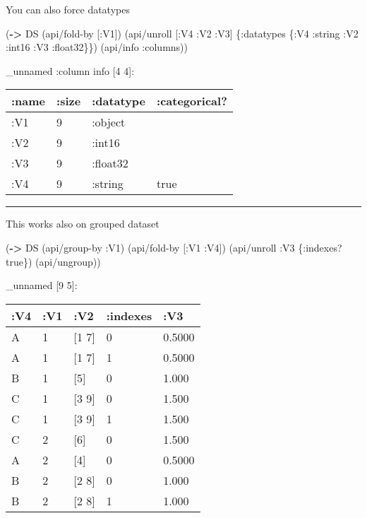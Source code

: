 \documentclass[]{article}
\newenvironment{Shaded}{\begin{snugshade}}{\end{snugshade}}
\newcommand{\KeywordTok}[1]{\textcolor[rgb]{0.13,0.29,0.53}{\textbf{#1}}}
\newcommand{\VariableTok}[1]{\textcolor[rgb]{0.00,0.00,0.00}{#1}}
\newcommand{\AttributeTok}[1]{\textcolor[rgb]{0.77,0.63,0.00}{#1}}
\newcommand{\NormalTok}[1]{#1}
\begin{document}
You can also force datatypes

\begin{Shaded}
\begin{Highlighting}[]
\NormalTok{(}\KeywordTok{->}\NormalTok{ DS}
\NormalTok{    (api/fold-by [}\AttributeTok{:V1}\NormalTok{])}
\NormalTok{    (api/unroll [}\AttributeTok{:V4} \AttributeTok{:V2} \AttributeTok{:V3}\NormalTok{] \{}\AttributeTok{:datatypes}\NormalTok{ \{}\AttributeTok{:V4} \AttributeTok{:string}
                                           \AttributeTok{:V2} \AttributeTok{:int16}
                                           \AttributeTok{:V3} \AttributeTok{:float32}\NormalTok{\}\})}
\NormalTok{    (api/info }\AttributeTok{:columns}\NormalTok{))}
\end{Highlighting}
\end{Shaded}

\_unnamed :column info {[}4 4{]}:

\begin{longtable}[]{@{}llll@{}}
\toprule
:name & :size & :datatype & :categorical?\tabularnewline
\midrule
\endhead
:V1 & 9 & :object &\tabularnewline
:V2 & 9 & :int16 &\tabularnewline
:V3 & 9 & :float32 &\tabularnewline
:V4 & 9 & :string & true\tabularnewline
\bottomrule
\end{longtable}

\begin{center}\rule{0.5\linewidth}{0.5pt}\end{center}

This works also on grouped dataset

\begin{Shaded}
\begin{Highlighting}[]
\NormalTok{(}\KeywordTok{->}\NormalTok{ DS}
\NormalTok{    (api/group-by }\AttributeTok{:V1}\NormalTok{)}
\NormalTok{    (api/fold-by [}\AttributeTok{:V1} \AttributeTok{:V4}\NormalTok{])}
\NormalTok{    (api/unroll }\AttributeTok{:V3}\NormalTok{ \{}\AttributeTok{:indexes}\NormalTok{? }\VariableTok{true}\NormalTok{\})}
\NormalTok{    (api/ungroup))}
\end{Highlighting}
\end{Shaded}

\_unnamed {[}9 5{]}:

\begin{longtable}[]{@{}lllll@{}}
\toprule
:V4 & :V1 & :V2 & :indexes & :V3\tabularnewline
\midrule
\endhead
A & 1 & {[}1 7{]} & 0 & 0.5000\tabularnewline
A & 1 & {[}1 7{]} & 1 & 0.5000\tabularnewline
B & 1 & {[}5{]} & 0 & 1.000\tabularnewline
C & 1 & {[}3 9{]} & 0 & 1.500\tabularnewline
C & 1 & {[}3 9{]} & 1 & 1.500\tabularnewline
C & 2 & {[}6{]} & 0 & 1.500\tabularnewline
A & 2 & {[}4{]} & 0 & 0.5000\tabularnewline
B & 2 & {[}2 8{]} & 0 & 1.000\tabularnewline
B & 2 & {[}2 8{]} & 1 & 1.000\tabularnewline
\bottomrule
\end{longtable}
\end{document}
